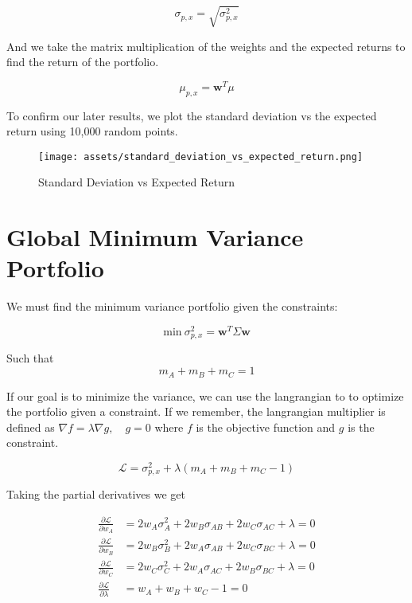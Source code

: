 \documentclass[journal,transmag]{IEEEtran}
\begin{document}
\begin{equation}
\sigma_{p,x} = \sqrt{\sigma_{p,x}^2}
\end{equation}

\noindent And we take the matrix multiplication of the weights and the expected returns to find the return of the portfolio.

\begin{equation}
\mu_{p,x} = \mathbf{w}^T \mu
\end{equation}

To confirm our later results, we plot the standard deviation vs the expected return using 10,000 random points.

\begin{figure}[H]
\centering
\texttt{[image: assets/standard\_deviation\_vs\_expected\_return.png]}
\caption{Standard Deviation vs Expected Return}
\end{figure}

\section{Global Minimum Variance Portfolio}
We must find the minimum variance portfolio given the constraints:

\begin{equation}
\text{min} ~ \sigma_{p,x}^2 = \mathbf{w}^T \Sigma \mathbf{w}
\end{equation}

\noindent Such that
\begin{equation}
m_A + m_B + m_C = 1
\end{equation}

If our goal is to minimize the variance, we can use the langrangian to to optimize the portfolio given a constraint. 
If we remember, the langrangian multiplier is defined as $\nabla f = \lambda \nabla g, \quad g = 0$ 
where $f$ is the objective function and $g$ is the constraint. 

\begin{equation}
\mathcal{L} = \sigma_{p,x}^2 + \lambda (m_A + m_B + m_C - 1)
\end{equation}

\noindent Taking the partial derivatives we get 


\begin{align}
\frac{\partial \mathcal{L}}{\partial w_A} &= 2w_A\sigma_A^2 + 2w_B\sigma_{AB} + 2w_C\sigma_{AC} + \lambda = 0 \\
\frac{\partial \mathcal{L}}{\partial w_B} &= 2w_B\sigma_B^2 + 2w_A\sigma_{AB} + 2w_C\sigma_{BC} + \lambda = 0 \\
\frac{\partial \mathcal{L}}{\partial w_C} &= 2w_C\sigma_C^2 + 2w_A\sigma_{AC} + 2w_B\sigma_{BC} + \lambda = 0 \\
\frac{\partial \mathcal{L}}{\partial \lambda} &= w_A + w_B + w_C - 1 = 0
\end{align}
\end{document}

